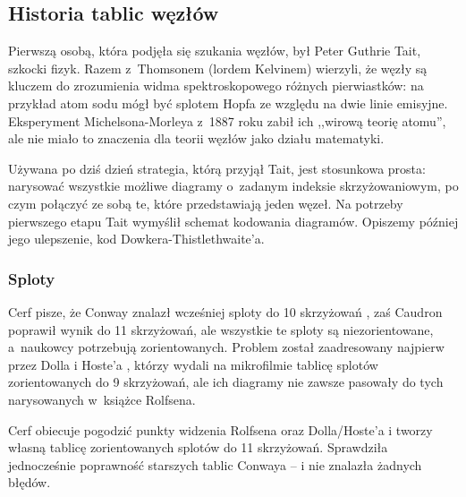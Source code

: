 
\subsection{Historia tablic węzłów}
Pierwszą osobą, która podjęła się szukania węzłów, był Peter Guthrie Tait, szkocki fizyk.
%
Razem z~Thomsonem (lordem Kelvinem) wierzyli, że węzły są kluczem do zrozumienia widma spektroskopowego różnych pierwiastków: na przykład atom sodu mógł być splotem Hopfa ze względu na dwie linie emisyjne.
%
Eksperyment Michelsona-Morleya z~1887 roku zabił ich ,,wirową teorię atomu'', ale nie miało to znaczenia dla teorii węzłów jako działu matematyki.

Używana po dziś dzień strategia, którą przyjął Tait, jest stosunkowa prosta: narysować wszystkie możliwe diagramy o~zadanym indeksie skrzyżowaniowym, po czym połączyć ze sobą te, które przedstawiają jeden węzeł.
Na potrzeby pierwszego etapu Tait wymyślił schemat kodowania diagramów.
Opiszemy później jego ulepszenie, kod Dowkera-Thistlethwaite'a.













\subsubsection{Sploty}
Cerf \cite{cerf98} pisze, że Conway znalazł wcześniej sploty do 10 skrzyżowań \cite{conway70}, zaś Caudron \cite{caudron82} poprawił wynik do 11 skrzyżowań, ale wszystkie te sploty są niezorientowane, a~naukowcy potrzebują zorientowanych.
%
%
%
Problem został zaadresowany najpierw przez Dolla i Hoste'a \cite{doll91}, którzy wydali na mikrofilmie tablicę splotów zorientowanych do 9 skrzyżowań, ale ich diagramy nie zawsze pasowały do tych narysowanych w~książce Rolfsena.
%
%

Cerf obiecuje pogodzić punkty widzenia Rolfsena oraz Dolla/Hoste'a i tworzy własną tablicę zorientowanych splotów do 11 skrzyżowań.
Sprawdziła jednocześnie poprawność starszych tablic Conwaya -- i nie znalazła żadnych błędów.

